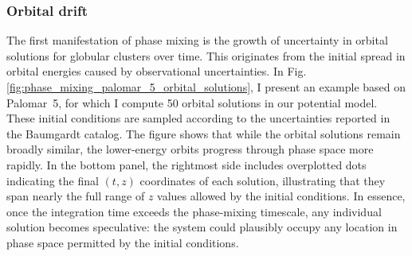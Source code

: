         \subsubsection{Orbital drift}
            The first manifestation of phase mixing is the growth of uncertainty in orbital solutions for globular clusters over time. This originates from the initial spread in orbital energies caused by observational uncertainties. In Fig.\ref{fig:phase_mixing_palomar_5_orbital_solutions}, I present an example based on Palomar~5, for which I compute 50 orbital solutions in our potential model. These initial conditions are sampled according to the uncertainties reported in the Baumgardt catalog. The figure shows that while the orbital solutions remain broadly similar, the lower-energy orbits progress through phase space more rapidly. In the bottom panel, the rightmost side includes overplotted dots indicating the final $(t, z)$ coordinates of each solution, illustrating that they span nearly the full range of $z$ values allowed by the initial conditions. In essence, once the integration time exceeds the phase-mixing timescale, any individual solution becomes speculative: the system could plausibly occupy any location in phase space permitted by the initial conditions.
